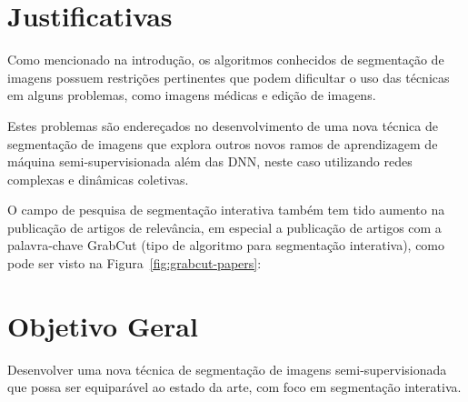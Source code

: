 \section{Justificativas}\label{sec:justificativas}

Como mencionado na introdução, os algoritmos conhecidos de segmentação
de imagens possuem restrições pertinentes que podem dificultar o uso
das técnicas em alguns problemas, como imagens médicas e edição de
imagens.

Estes problemas são endereçados no desenvolvimento de uma nova técnica
de segmentação de imagens que explora outros novos ramos de
aprendizagem de máquina semi-supervisionada além das \gls{DNN}, neste
caso utilizando redes complexas e dinâmicas coletivas.

O campo de pesquisa de segmentação interativa também tem tido aumento
na publicação de artigos de relevância, em especial a publicação de
artigos com a palavra-chave GrabCut (tipo de algoritmo para
segmentação interativa), como pode ser visto na
Figura~\ref{fig:grabcut-papers}:

\begin{figure}[!h]
        \captionsetup{width=12cm}
		\centering
\end{figure}



\section{Objetivo Geral}\label{sec:objetivo-geral}

Desenvolver uma nova técnica de segmentação de imagens
semi-supervisionada que possa ser equiparável ao estado da arte, com
foco em segmentação interativa.

